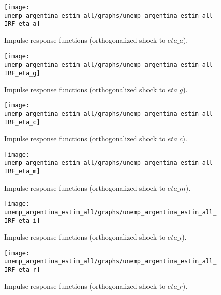  
\begin{figure}[H]
\centering 
\texttt{[image: unemp\_argentina\_estim\_all/graphs/unemp\_argentina\_estim\_all\_IRF\_eta\_a]}
\caption{Impulse response functions (orthogonalized shock to $eta\_a$).}
\label{Fig:IRF:eta_a}
\end{figure}
 
\begin{figure}[H]
\centering 
\texttt{[image: unemp\_argentina\_estim\_all/graphs/unemp\_argentina\_estim\_all\_IRF\_eta\_g]}
\caption{Impulse response functions (orthogonalized shock to $eta\_g$).}
\label{Fig:IRF:eta_g}
\end{figure}
 
\begin{figure}[H]
\centering 
\texttt{[image: unemp\_argentina\_estim\_all/graphs/unemp\_argentina\_estim\_all\_IRF\_eta\_c]}
\caption{Impulse response functions (orthogonalized shock to $eta\_c$).}
\label{Fig:IRF:eta_c}
\end{figure}
 
\begin{figure}[H]
\centering 
\texttt{[image: unemp\_argentina\_estim\_all/graphs/unemp\_argentina\_estim\_all\_IRF\_eta\_m]}
\caption{Impulse response functions (orthogonalized shock to $eta\_m$).}
\label{Fig:IRF:eta_m}
\end{figure}
 
\begin{figure}[H]
\centering 
\texttt{[image: unemp\_argentina\_estim\_all/graphs/unemp\_argentina\_estim\_all\_IRF\_eta\_i]}
\caption{Impulse response functions (orthogonalized shock to $eta\_i$).}
\label{Fig:IRF:eta_i}
\end{figure}
 
\begin{figure}[H]
\centering 
\texttt{[image: unemp\_argentina\_estim\_all/graphs/unemp\_argentina\_estim\_all\_IRF\_eta\_r]}
\caption{Impulse response functions (orthogonalized shock to $eta\_r$).}
\label{Fig:IRF:eta_r}
\end{figure}
 
 
